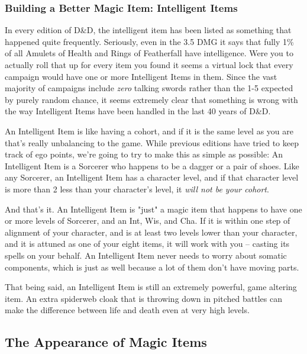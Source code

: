 \subsubsection{Building a Better Magic Item: Intelligent Items}
\vspace*{-8pt}

In every edition of D\&D, the intelligent item has been listed as something that happened quite frequently. Seriously, even in the 3.5 DMG it says that fully 1\% of all Amulets of Health and Rings of Featherfall have intelligence. Were you to actually roll that up for every item you found it seems a virtual lock that every campaign would have one or more Intelligent Items in them. Since the vast majority of campaigns include \textit{zero} talking swords rather than the 1-5 expected by purely random chance, it seems extremely clear that something is wrong with the way Intelligent Items have been handled in the last 40 years of D\&D.

An Intelligent Item is like having a cohort, and if it is the same level as you are that's really unbalancing to the game. While previous editions have tried to keep track of ego points, we're going to try to make this as simple as possible: An Intelligent Item is a Sorcerer who happens to be a dagger or a pair of shoes. Like any Sorcerer, an Intelligent Item has a character level, and if that character level is more than 2 less than your character's level, it \textit{will not be your cohort}.

And that's it. An Intelligent Item is "just" a magic item that happens to have one or more levels of Sorcerer, and an Int, Wis, and Cha. If it is within one step of alignment of your character, and is at least two levels lower than your character, and it is attuned as one of your eight items, it will work with you -- casting its spells on your behalf. An Intelligent Item never needs to worry about somatic components, which is just as well because a lot of them don't have moving parts.

That being said, an Intelligent Item is still an extremely powerful, game altering item. An extra spiderweb cloak that is throwing down  in pitched battles can make the difference between life and death even at very high levels.

\subsection{The Appearance of Magic Items}
\vspace*{-8pt}

